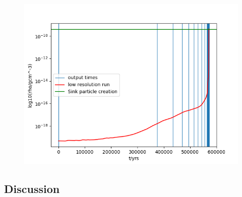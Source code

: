 \documentclass[11pt]{article}
\begin{document}
\begin{figure}[h!]
         \centering
		\includegraphics[width=12cm]{times_turb.png}
		\caption{}
		\label{fig:times}
\end{figure}



\subsection{Discussion}
\label{sub:discussion2}




\end{document}
